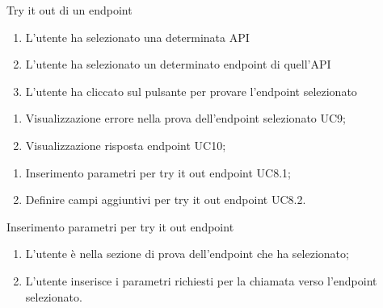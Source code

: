 \begin{usecase}{8}{Try it out di un endpoint}\label{uc:try-it-out-di-un-endpoint}

    \usecasemain{}
        \begin{enumerate}
            \item L'utente ha selezionato una determinata API
            \item L'utente ha selezionato un determinato endpoint di quell'API
            \item L'utente ha cliccato sul pulsante per provare l'endpoint selezionato
        \end{enumerate}

    \usecaseext{}
        \begin{enumerate}
            \item Visualizzazione errore nella prova dell'endpoint selezionato UC9;
            \item Visualizzazione risposta endpoint UC10;
        \end{enumerate}

    \usecasegen{}
        \begin{enumerate}
            \item Inserimento parametri per try it out endpoint UC8.1;
            \item Definire campi aggiuntivi per try it out endpoint UC8.2.
        \end{enumerate}

\end{usecase}


\begin{usecase}{8.1}{Inserimento parametri per try it out endpoint}\label{uc:inserimento-parametri-per-try-it-out-endpoint}

    \usecasemain{}
        \begin{enumerate}
            \item L'utente è nella sezione di prova dell'endpoint che ha selezionato;
            \item L'utente inserisce i parametri richiesti per la chiamata verso l'endpoint selezionato.
        \end{enumerate}

\end{usecase}


